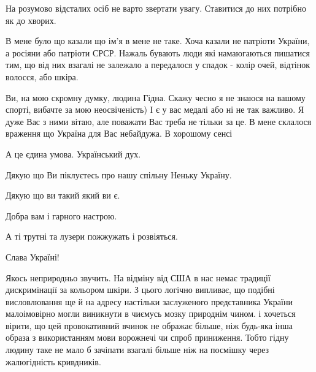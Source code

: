 \begin{itemize}
 

На розумово відсталих осіб не варто звертати увагу. Ставитися до них потрібно
як до хворих.

 

В мене було що казали що ім'я в мене не таке. Хоча казали не патріоти України,
а росіяни або патріоти СРСР. Нажаль бувають люди які намаюгаються пишатися тим,
що від них взагалі не залежало а передалося у спадок - колір очей, відтінок
волосся, або шкіра.

Ви, на мою скромну думку, людина Гідна. Скажу чесно я не знаюся на вашому
спорті, вибачте за мою неосвіченість) І є у вас медалі або ні не так важливо. Я
дуже Вас з ними вітаю, але поважати Вас треба не тільки за це. В мене склалося
враження що Україна для Вас небайдужа. В хорошому сенсі

А це єдина умова. Український дух.

Дякую що Ви піклуєтесь про нашу спільну Неньку Україну.

Дякую що ви такий який ви є.

Добра вам і гарного настрою.

А ті трутні та лузери пожжужать і розвіяться.

Слава Україні!

 

Якось неприродньо звучить. На відміну від США в нас немає традиції
дискримінації за кольором шкіри. З цього логічно випливає, що подібні
висловлювання ще й на адресу настільки заслуженого представника України
малоімовірно могли виникнути в чиємусь мозку природнім чином. і хочеться
вірити, що цей провокативний вчинок не ображає більше, ніж будь-яка інша образа
з використанням мови ворожнечі чи спроб приниження. Тобто гідну людину таке не
мало б зачіпати взагалі більше ніж на посмішку через жалюгідність кривдників.


\end{itemize}
